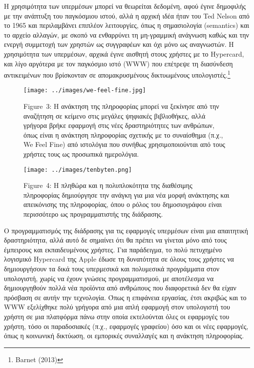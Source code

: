 \documentclass[
]{article}
\begin{document}
Η χρησιμότητα των υπερμέσων μπορεί να θεωρείται δεδομένη, αφού έγινε
δημοφιλής με την ανάπτυξη του παγκόσμιου ιστού, αλλά η αρχική ιδέα ήταν
του Ted Nelson από το 1965 και περιλαμβάνει επιπλέον λειτουργίες, όπως η
σημασιολογία (semantics) και το αρχείο αλλαγών, με σκοπό να ενθαρρύνει
τη μη-γραμμική ανάγνωση καθώς και την ενεργή συμμετοχή των χρηστών ως
συγγραφέων και όχι μόνο ως αναγνωστών. Η χρησιμότητα των υπερμέσων,
αρχικά έγινε αισθητή στους χρήστες με το Hypercard, και λίγο αργότερα με
τον παγκόσμιο ιστό (WWW) που επέτρεψε τη διασύνδεση αντικειμένων που
βρίσκονταν σε απομακρυσμένους δικτυωμένους υπολογιστές.\footnote{Barnet
  (2013)}

\leavevmode{}%
\begin{figure}
\hypertarget{fig:we-feel-fine}{%
\centering
\texttt{[image: ../images/we-feel-fine.jpg]}
\caption{Figure~3: Η ανάκτηση της πληροφορίας μπορεί να ξεκίνησε από την
αναζήτηση σε κείμενο στις μεγάλες ψηφιακές βιβλιοθήκες, αλλά γρήγορα
βρήκε εφαρμογή στις νέες δραστηριότητες των ανθρώπων, όπως είναι η
ανάκτηση πληροφορίας σχετικής με το συναίσθημα (π.χ., We Feel Fine) από
ιστολόγια που συνήθως χρησιμοποιούνται από τους χρήστες τους ως
προσωπικά ημερολόγια.}\label{fig:we-feel-fine}
}
\end{figure}

\leavevmode{}%
\begin{figure}
\hypertarget{fig:tenbyten}{%
\centering
\texttt{[image: ../images/tenbyten.png]}
\caption{Figure~4: Η πληθώρα και η πολυπλοκότητα της διαθέσιμης
πληροφορίας δημιούργησε την ανάγκη για μια νέα μορφή ανάκτησης και
απεικόνισης της πληροφορίας, όπου ο ρόλος του δημοσιογράφου είναι
περισσότερο ως προγραμματιστής της διάδρασης.}\label{fig:tenbyten}
}
\end{figure}

Ο προγραμματισμός της διάδρασης για τις εφαρμογές υπερμέσων είναι μια
απαιτητική δραστηριότητα, αλλά αυτό δε σημαίνει ότι θα πρέπει να γίνεται
μόνο από τους έμπειρους και εκπαιδευμένους χρήστες. Για παράδειγμα, το
πολύ πετυχημένο λογισμικό Hypercard της Apple έδωσε τη δυνατότητα σε
όλους τους χρήστες να δημιουργήσουν τα δικά τους υπερμεσικά και
πολυμεσικά προγράμματα στον υπολογιστή, χωρίς να έχουν γνώσεις
προγραμματισμού, με αποτέλεσμα να δημιουργηθούν πολλά νέα προϊόντα από
ανθρώπους που διαφορετικά δεν θα είχαν πρόσβαση σε αυτήν την τεχνολογία.
Όπως η επιφάνεια εργασίας, έτσι ακριβώς και το WWW εξελίχθηκε πολύ
γρήγορα από μια απλή εφαρμογή στον υπολογιστή του χρήστη σε μια
πλατφόρμα πάνω στην οποία εκτελούνται όλες οι εφαρμογές του χρήστη, τόσο
οι παραδοσιακές (π.χ., εφαρμογές γραφείου) όσο και οι νέες εφαρμογές,
όπως η κοινωνική δικτύωση, οι εμπορικές συναλλαγές και η ανάκτηση
πληροφορίας.
\end{document}
